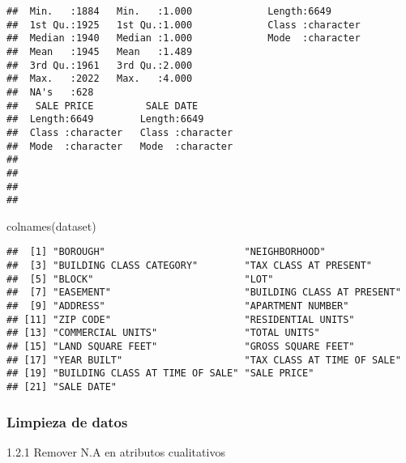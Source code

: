 \documentclass[
]{article}
\newenvironment{Shaded}{\begin{snugshade}}{\end{snugshade}}
\newcommand{\AttributeTok}[1]{\textcolor[rgb]{0.77,0.63,0.00}{#1}}
\newcommand{\CommentTok}[1]{\textcolor[rgb]{0.56,0.35,0.01}{\textit{#1}}}
\newcommand{\FunctionTok}[1]{\textcolor[rgb]{0.00,0.00,0.00}{#1}}
\newcommand{\NormalTok}[1]{#1}
\newcommand{\OtherTok}[1]{\textcolor[rgb]{0.56,0.35,0.01}{#1}}
\newcommand{\SpecialCharTok}[1]{\textcolor[rgb]{0.00,0.00,0.00}{#1}}
\newcommand{\StringTok}[1]{\textcolor[rgb]{0.31,0.60,0.02}{#1}}
\begin{document}
\begin{verbatim}
##  Min.   :1884   Min.   :1.000             Length:6649                   
##  1st Qu.:1925   1st Qu.:1.000             Class :character              
##  Median :1940   Median :1.000             Mode  :character              
##  Mean   :1945   Mean   :1.489                                           
##  3rd Qu.:1961   3rd Qu.:2.000                                           
##  Max.   :2022   Max.   :4.000                                           
##  NA's   :628                                                            
##   SALE PRICE         SALE DATE        
##  Length:6649        Length:6649       
##  Class :character   Class :character  
##  Mode  :character   Mode  :character  
##                                       
##                                       
##                                       
## 
\end{verbatim}

\begin{Shaded}
\begin{Highlighting}[]
\FunctionTok{colnames}\NormalTok{(dataset)}
\end{Highlighting}
\end{Shaded}

\begin{verbatim}
##  [1] "BOROUGH"                        "NEIGHBORHOOD"                  
##  [3] "BUILDING CLASS CATEGORY"        "TAX CLASS AT PRESENT"          
##  [5] "BLOCK"                          "LOT"                           
##  [7] "EASEMENT"                       "BUILDING CLASS AT PRESENT"     
##  [9] "ADDRESS"                        "APARTMENT NUMBER"              
## [11] "ZIP CODE"                       "RESIDENTIAL UNITS"             
## [13] "COMMERCIAL UNITS"               "TOTAL UNITS"                   
## [15] "LAND SQUARE FEET"               "GROSS SQUARE FEET"             
## [17] "YEAR BUILT"                     "TAX CLASS AT TIME OF SALE"     
## [19] "BUILDING CLASS AT TIME OF SALE" "SALE PRICE"                    
## [21] "SALE DATE"
\end{verbatim}

\hypertarget{limpieza-de-datos}{%
\subsubsection{Limpieza de datos}\label{limpieza-de-datos}}

1.2.1 Remover N.A en atributos cualitativos

\begin{Shaded}
\end{Shaded}
\end{document}
